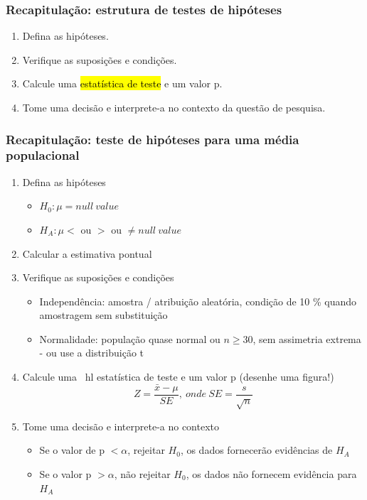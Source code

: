\documentclass[11pt]{beamer}
\begin{document}
\begin{frame}
\frametitle{Recapitulação: estrutura de testes de hipóteses}

\begin{enumerate}

\item Defina as hipóteses.

\item Verifique as suposições e condições.

\item Calcule uma \hl {estatística de teste} e um valor p.

\item Tome uma decisão e interprete-a no contexto da questão de pesquisa.

\end{enumerate}

\end{frame}


\begin{frame}
\frametitle{Recapitulação: teste de hipóteses para uma média populacional}

\begin{enumerate}

\item Defina as hipóteses
\begin{itemize}
\item $H_0: \mu = null~value$
\item $H_A: \mu <$ ou $>$ ou $\ne null~value$
\end{itemize}

\item Calcular a estimativa pontual

\item Verifique as suposições e condições
\begin{itemize}
\item Independência: amostra / atribuição aleatória, condição de 10 \% quando amostragem sem substituição
\item Normalidade: população quase normal ou $ n \ge 30 $, sem assimetria extrema - ou use a distribuição t
\end{itemize}

\item Calcule uma \ hl {estatística de teste} e um valor p (desenhe uma figura!)
\[ Z = \frac{\bar{x} - \mu}{SE},~onde~SE = \frac{s}{\sqrt{n}} \]

\item Tome uma decisão e interprete-a no contexto
\begin{itemize}
\item Se o valor de p $ <\alpha $, rejeitar $ H_0 $, os dados fornecerão evidências de $ H_A $
\item Se o valor p $> \alpha $, não rejeitar $ H_0 $, os dados não fornecem evidência para $ H_A $
\end{itemize}

\end{enumerate}

\end{frame}

\end{document}
